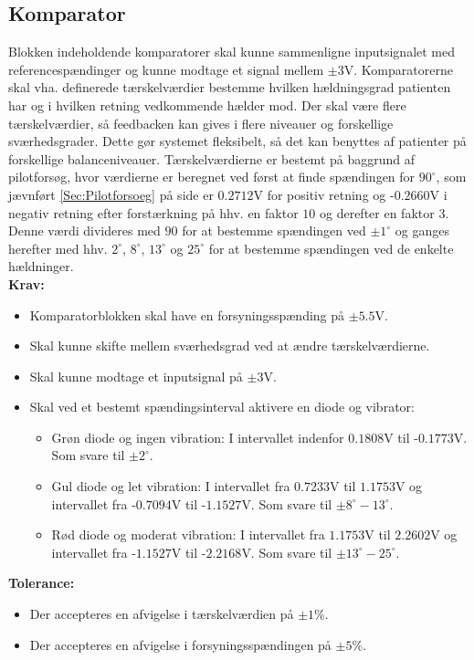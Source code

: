 \subsection{Komparator}\label{KomparatorAfs} 
Blokken indeholdende komparatorer skal kunne sammenligne inputsignalet med referencespændinger og kunne modtage et signal mellem $\pm3$V. Komparatorerne skal vha. definerede tærskelværdier bestemme hvilken hældningsgrad patienten har og i hvilken retning vedkommende hælder mod. Der skal være flere tærskelværdier, så feedbacken kan gives i flere niveauer og forskellige sværhedsgrader. Dette gør systemet fleksibelt, så det kan benyttes af patienter på forskellige balanceniveauer. Tærskelværdierne er bestemt på baggrund af pilotforsøg, hvor værdierne er beregnet ved først at finde spændingen for $90^{\circ}$, som jævnført \ref{Sec:Pilotforsoeg} på side \pageref{Sec:Pilotforsoeg} er $0.2712$V for positiv retning og -$0.2660$V i negativ retning efter forstærkning på hhv. en faktor $10$ og derefter en faktor $3$. Denne værdi divideres med $90$ for at bestemme spændingen ved $\pm1^{\circ}$ og ganges herefter med hhv. $2^{\circ}$,  $8^{\circ}$, $13^{\circ}$ og $25^{\circ}$ for at bestemme spændingen ved de enkelte hældninger.\\
\textbf{Krav:} 
\begin{itemize}
	\item Komparatorblokken skal have en forsyningsspænding på  $\pm5.5$V.
	\item Skal kunne skifte mellem sværhedsgrad ved at ændre tærskelværdierne.
	\item Skal kunne modtage et inputsignal på $\pm3$V. 
	\item Skal ved et bestemt spændingsinterval aktivere en diode og vibrator:
	\begin{itemize}
		\item Grøn diode og ingen vibration: I intervallet indenfor $0.1808$V til -$0.1773$V. Som svare til $\pm2^{\circ}$.
		\item Gul diode og let vibration: I intervallet fra $0.7233$V til $1.1753$V og intervallet fra -$0.7094$V til -$1.1527$V. Som svare til $\pm 8^{\circ}-13^{\circ}$.
		\item Rød diode og moderat vibration: I intervallet fra $1.1753$V til $2.2602$V og intervallet fra -$1.1527$V til -$2.2168$V. Som svare til $\pm13^{\circ}-25^{\circ}$.
	\end{itemize}
\end{itemize}
\textbf{Tolerance:}
\begin{itemize}
	\item Der accepteres en afvigelse i tærskelværdien på $\pm1\%$.
	\item Der accepteres en afvigelse i forsyningsspændingen på $\pm5\%$.
\end{itemize}
